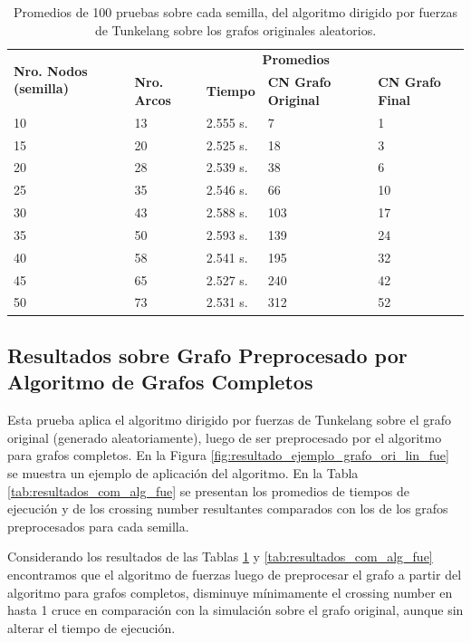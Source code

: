 \begin{table}
	\caption{Promedios de 100 pruebas sobre cada semilla, del algoritmo dirigido por fuerzas de Tunkelang sobre los grafos originales aleatorios.}
	\label{tab:resultados_orig_alg_fue}
	\begin{tabularx}{\linewidth}{|p{1.5cm}|p{1.2cm}|p{1.5cm}|X|X|}
		\hline
		\multirow{2}{2cm}{\textbf{Nro. Nodos (semilla)}} & \multicolumn{4}{c|}{\textbf{Promedios}} \\
		\cline{2-5}
		& \textbf{Nro. Arcos} & \textbf{Tiempo} & \textbf{CN Grafo Original} & \textbf{CN Grafo Final} \\
		\hline
		10 & 13 & 2.555 s. & 7 & 1 \\
		\hline
		15 & 20 & 2.525 s. & 18 & 3 \\
		\hline
		20 & 28 & 2.539 s. & 38 & 6 \\
		\hline
		25 & 35 & 2.546 s. & 66 & 10 \\
		\hline
		30 & 43 & 2.588 s. & 103 & 17 \\
		\hline
		35 & 50 & 2.593 s. & 139 & 24 \\
		\hline
		40 & 58 & 2.541 s. & 195 & 32 \\
		\hline
		45 & 65 & 2.527 s. & 240 & 42 \\
		\hline
		50 & 73 & 2.531 s. & 312 & 52 \\
		\hline
	\end{tabularx}
\end{table}

\subsection{Resultados sobre Grafo Preprocesado por Algoritmo de Grafos Completos}
Esta prueba aplica el algoritmo dirigido por fuerzas de Tunkelang sobre el grafo original (generado aleatoriamente), luego de ser preprocesado por el algoritmo para grafos completos. En la Figura \ref{fig:resultado_ejemplo_grafo_ori_lin_fue} se muestra un ejemplo de aplicación del algoritmo. En la Tabla \ref{tab:resultados_com_alg_fue} se presentan los promedios de tiempos de ejecución y de los crossing number resultantes comparados con los de los grafos preprocesados para cada semilla.

Considerando los resultados de las Tablas \ref{tab:resultados_orig_alg_fue} y \ref{tab:resultados_com_alg_fue} encontramos que el algoritmo de fuerzas luego de preprocesar el grafo a partir del algoritmo para grafos completos, disminuye mínimamente el crossing number en hasta 1 cruce en comparación con la simulación sobre el grafo original, aunque sin alterar el tiempo de ejecución.

